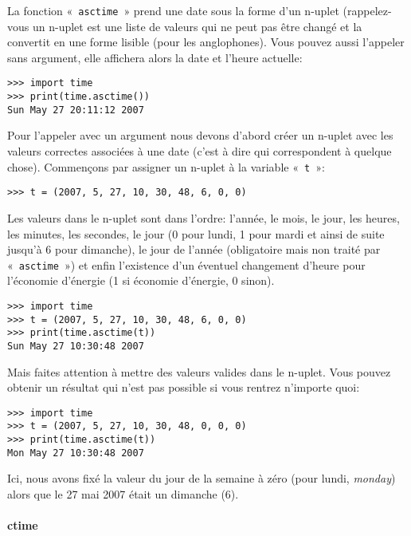 La fonction «~\verb+asctime+~» prend une date sous la forme d'un n-uplet (rappelez-vous un n-uplet est une liste de valeurs qui ne peut pas être changé et la convertit en une forme lisible (pour les anglophones). Vous pouvez aussi l'appeler sans argument, elle affichera alors la date et l'heure actuelle:

\begin{Verbatim}[frame=single,rulecolor=\color{gray}]
>>> import time
>>> print(time.asctime())
Sun May 27 20:11:12 2007
\end{Verbatim}

Pour l'appeler avec un argument nous devons d'abord créer un n-uplet avec les valeurs correctes associées à une date (c'est à dire qui correspondent à quelque chose). Commençons par assigner un n-uplet à la variable «~\texttt{t}~»:

\begin{Verbatim}[frame=single,rulecolor=\color{gray}]
>>> t = (2007, 5, 27, 10, 30, 48, 6, 0, 0)
\end{Verbatim}

Les valeurs dans le n-uplet sont dans l'ordre: l'année, le mois, le jour, les heures, les minutes, les secondes, le jour (0 pour lundi, 1 pour mardi et ainsi de suite jusqu'à 6 pour dimanche), le jour de l'année (obligatoire mais non traité par «~\texttt{asctime}~») et enfin l'existence d'un éventuel changement d'heure pour l'économie d'énergie (1 si économie d'énergie, 0 sinon).

\begin{Verbatim}[frame=single,rulecolor=\color{gray}]
>>> import time
>>> t = (2007, 5, 27, 10, 30, 48, 6, 0, 0)
>>> print(time.asctime(t))
Sun May 27 10:30:48 2007
\end{Verbatim}

Mais faites attention à mettre des valeurs valides dans le n-uplet. Vous pouvez obtenir un résultat qui n'est pas possible si vous rentrez n'importe quoi:

\begin{Verbatim}[frame=single,rulecolor=\color{gray}]
>>> import time
>>> t = (2007, 5, 27, 10, 30, 48, 0, 0, 0)
>>> print(time.asctime(t))
Mon May 27 10:30:48 2007
\end{Verbatim}

Ici, nous avons fixé la valeur du jour de la semaine à zéro (pour lundi, \emph{monday}) alors que le 27 mai 2007 était un dimanche (6).

\paragraph{ctime}

